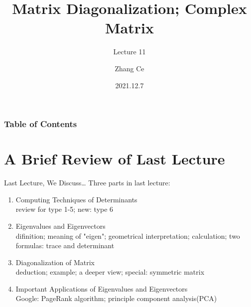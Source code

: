 \documentclass{beamer}
\title[Linear Algebra] %
{Matrix Diagonalization; Complex Matrix}
\subtitle{Lecture 11}
\author[11910803@mail.sustech.edu.cn] %
{
    Zhang Ce
}
\institute[] %
{
    Department of Electrical and Electronic Engineering\\
    Southern University of Science and Technology
}
\date[2021.12.7] %
{2021.12.7}
\begin{document}
\frame{\titlepage}


\begin{frame}
\frametitle{Table of Contents}
\tableofcontents
\end{frame}
\section{A Brief Review of Last Lecture}
\begin{frame}{Last Lecture, We Discuss\dots}
Three parts in last lecture:
    \begin{enumerate}
        \item Computing Techniques of Determinants\\
        review for type 1-5; new: type 6
        \item Eigenvalues and Eigenvectors\\
        difinition; meaning of "eigen"; geometrical interpretation; calculation; two formulas: trace and determinant
        \item Diagonalization of Matrix\\
        deduction; example; a deeper view; special: symmetric matrix
        \item Important Applications of Eigenvalues and Eigenvectors\\
        Google: PageRank algorithm; principle component analysis(PCA)
    \end{enumerate}

\end{frame}
\end{document}
